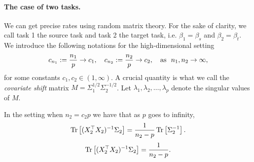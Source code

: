 \paragraph{The case of two tasks.}
We can get precise rates using random matrix theory.
For the sake of clarity, we call task 1 the source task and task 2 the target task,
i.e. $\beta_1 = \beta_s$ and $\beta_2 = \beta_t$.
We introduce the following notations for the high-dimensional setting
\[ c_{n_1} := \frac{n_1}{p} \to c_1, \quad c_{n_2} := \frac{n_2}p \to c_2, \quad \text{as } \ n_1, n_2\to \infty, \]
for some constants $c_1, c_2 \in (1,\infty)$.
A crucial quantity is what we call the \textit{covariate shift} matrix $M = \Sigma_1^{1/2}\Sigma_2^{-1/2}$.
Let $\lambda_1, \lambda_2, \dots, \lambda_p$ denote the singular values of $M$.

\begin{lemma}\label{lem_minv}
	In the setting when $n_2 = c_2 p$ we have that as $p$ goes to infinity,
	\[ \operatorname{Tr}\left[(X_2^{\top}X_2)^{-1}\Sigma_2\right] = \frac{1}{n_2 - p}\operatorname{Tr}\left[\Sigma_2^{-1}\right]. \]
	{\color{blue} \[ \operatorname{Tr}\left[(X_2^{\top}X_2)^{-1}\Sigma_2\right] = \frac{1}{n_2 - p} . \]}
\end{lemma}